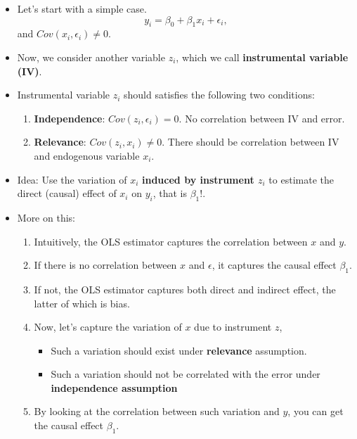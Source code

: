 \documentclass[]{book}
\providecommand{\tightlist}{%
  \setlength{\itemsep}{0pt}\setlength{\parskip}{0pt}}
\begin{document}
\begin{itemize}
\item
  Let's start with a simple case. \[
  y_i = \beta_0 + \beta_1 x_i + \epsilon_i, 
  \] and \(Cov(x_i, \epsilon_i) \neq 0\).
\item
  Now, we consider another variable \(z_i\), which we call
  \textbf{instrumental variable (IV)}.
\item
  Instrumental variable \(z_i\) should satisfies the following two
  conditions:

  \begin{enumerate}
  \def\labelenumi{\arabic{enumi}.}
  \tightlist
  \item
    \textbf{Independence}: \(Cov(z_i, \epsilon_i) = 0\). No correlation
    between IV and error.
  \item
    \textbf{Relevance}: \(Cov(z_i, x_i) \neq 0\). There should be
    correlation between IV and endogenous variable \(x_i\).
  \end{enumerate}
\item
  Idea: Use the variation of \(x_i\) \textbf{induced by instrument
  \(z_i\)} to estimate the direct (causal) effect of \(x_i\) on \(y_i\),
  that is \(\beta_1\)!.
\item
  More on this:

  \begin{enumerate}
  \def\labelenumi{\arabic{enumi}.}
  \tightlist
  \item
    Intuitively, the OLS estimator captures the correlation between
    \(x\) and \(y\).
  \item
    If there is no correlation between \(x\) and \(\epsilon\), it
    captures the causal effect \(\beta_1\).
  \item
    If not, the OLS estimator captures both direct and indirect effect,
    the latter of which is bias.
  \item
    Now, let's capture the variation of \(x\) due to instrument \(z\),

    \begin{itemize}
    \tightlist
    \item
      Such a variation should exist under \textbf{relevance} assumption.
    \item
      Such a variation should not be correlated with the error under
      \textbf{independence assumption}
    \end{itemize}
  \item
    By looking at the correlation between such variation and \(y\), you
    can get the causal effect \(\beta_1\).
  \end{enumerate}
\end{itemize}
\end{document}
